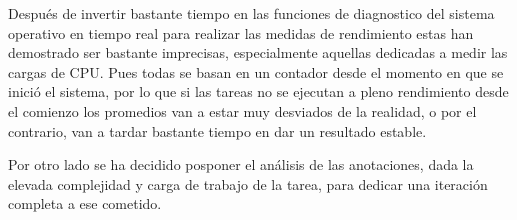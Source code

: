         Después de invertir bastante tiempo en las funciones de diagnostico del sistema operativo en tiempo real para realizar las medidas de rendimiento estas han demostrado ser bastante imprecisas, especialmente aquellas dedicadas a medir las cargas de CPU. Pues todas se basan en un contador desde el momento en que se inició el sistema, por lo que si las tareas no se ejecutan a pleno rendimiento desde el comienzo los promedios van a estar muy desviados de la realidad, o por el contrario, van a tardar bastante tiempo en dar un resultado estable.
        
        Por otro lado se ha decidido posponer el análisis de las anotaciones, dada la elevada complejidad y carga de trabajo de la tarea, para dedicar una iteración completa a ese cometido.